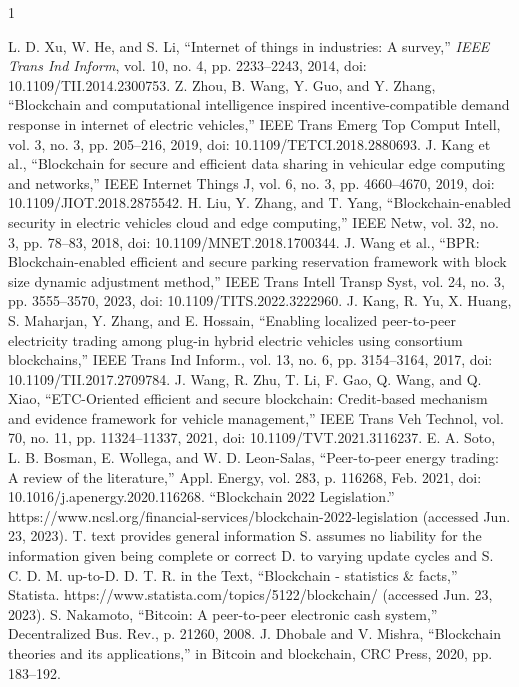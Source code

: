 \documentclass[lettersize,journal]{IEEEtran}
\begin{document}
\begin{thebibliography}{1}

\bibitem{}L. D. Xu, W. He, and S. Li, “Internet of things in industries: A survey,” \emph{IEEE Trans Ind Inform}, vol. 10, no. 4, pp. 2233–2243, 2014, doi: 10.1109/TII.2014.2300753.
\bibitem{}Z. Zhou, B. Wang, Y. Guo, and Y. Zhang, “Blockchain and computational intelligence inspired incentive-compatible demand response in internet of electric vehicles,” IEEE Trans Emerg Top Comput Intell, vol. 3, no. 3, pp. 205–216, 2019, doi: 10.1109/TETCI.2018.2880693.
\bibitem{}J. Kang et al., “Blockchain for secure and efficient data sharing in vehicular edge computing and networks,” IEEE Internet Things J, vol. 6, no. 3, pp. 4660–4670, 2019, doi: 10.1109/JIOT.2018.2875542.
\bibitem{}H. Liu, Y. Zhang, and T. Yang, “Blockchain-enabled security in electric vehicles cloud and edge computing,” IEEE Netw, vol. 32, no. 3, pp. 78–83, 2018, doi: 10.1109/MNET.2018.1700344.
\bibitem{}J. Wang et al., “BPR: Blockchain-enabled efficient and secure parking reservation framework with block size dynamic adjustment method,” IEEE Trans Intell Transp Syst, vol. 24, no. 3, pp. 3555–3570, 2023, doi: 10.1109/TITS.2022.3222960.
\bibitem{}J. Kang, R. Yu, X. Huang, S. Maharjan, Y. Zhang, and E. Hossain, “Enabling localized peer-to-peer electricity trading among plug-in hybrid electric vehicles using consortium blockchains,” IEEE Trans Ind Inform., vol. 13, no. 6, pp. 3154–3164, 2017, doi: 10.1109/TII.2017.2709784.
\bibitem{}J. Wang, R. Zhu, T. Li, F. Gao, Q. Wang, and Q. Xiao, “ETC-Oriented efficient and secure blockchain: Credit-based mechanism and evidence framework for vehicle management,” IEEE Trans Veh Technol, vol. 70, no. 11, pp. 11324–11337, 2021, doi: 10.1109/TVT.2021.3116237.
\bibitem{}E. A. Soto, L. B. Bosman, E. Wollega, and W. D. Leon-Salas, “Peer-to-peer energy trading: A review of the literature,” Appl. Energy, vol. 283, p. 116268, Feb. 2021, doi: 10.1016/j.apenergy.2020.116268.
\bibitem{}“Blockchain 2022 Legislation.” https://www.ncsl.org/financial-services/blockchain-2022-legislation (accessed Jun. 23, 2023).
\bibitem{}T. text provides general information S. assumes no liability for the information given being complete or correct D. to varying update cycles and S. C. D. M. up-to-D. D. T. R. in the Text, “Blockchain - statistics \& facts,” Statista. https://www.statista.com/topics/5122/blockchain/ (accessed Jun. 23, 2023).
\bibitem{}S. Nakamoto, “Bitcoin: A peer-to-peer electronic cash system,” Decentralized Bus. Rev., p. 21260, 2008.
\bibitem{}J. Dhobale and V. Mishra, “Blockchain theories and its applications,” in Bitcoin and blockchain, CRC Press, 2020, pp. 183–192.

\end{thebibliography}
\end{document}
